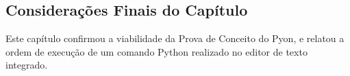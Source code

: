 \begin{apendicesenv}
\section{Considerações Finais do Capítulo}
Este capítulo confirmou a viabilidade da Prova de Conceito do Pyon, e relatou a ordem de execução 
de um comando Python realizado no editor de texto integrado.

\end{apendicesenv}
